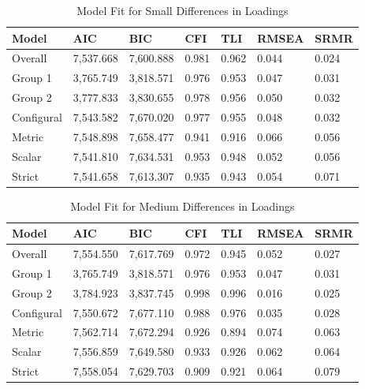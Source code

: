 \documentclass[
  man]{apa7}
\begin{document}
\begin{table}[tbp]

\begin{center}
\begin{threeparttable}

\caption{\label{tab:tab2}Model Fit for Small Differences in Loadings}

\begin{tabular}{lllllll}
\toprule
Model & AIC & BIC & CFI & TLI & RMSEA & SRMR\\
\midrule
Overall & 7,537.668 & 7,600.888 & 0.981 & 0.962 & 0.044 & 0.024\\
Group 1 & 3,765.749 & 3,818.571 & 0.976 & 0.953 & 0.047 & 0.031\\
Group 2 & 3,777.833 & 3,830.655 & 0.978 & 0.956 & 0.050 & 0.032\\
Configural & 7,543.582 & 7,670.020 & 0.977 & 0.955 & 0.048 & 0.032\\
Metric & 7,548.898 & 7,658.477 & 0.941 & 0.916 & 0.066 & 0.056\\
Scalar & 7,541.810 & 7,634.531 & 0.953 & 0.948 & 0.052 & 0.056\\
Strict & 7,541.658 & 7,613.307 & 0.935 & 0.943 & 0.054 & 0.071\\
\bottomrule
\end{tabular}

\end{threeparttable}
\end{center}

\end{table}

\begin{table}[tbp]

\begin{center}
\begin{threeparttable}

\caption{\label{tab:tab3}Model Fit for Medium Differences in Loadings}

\begin{tabular}{lllllll}
\toprule
Model & AIC & BIC & CFI & TLI & RMSEA & SRMR\\
\midrule
Overall & 7,554.550 & 7,617.769 & 0.972 & 0.945 & 0.052 & 0.027\\
Group 1 & 3,765.749 & 3,818.571 & 0.976 & 0.953 & 0.047 & 0.031\\
Group 2 & 3,784.923 & 3,837.745 & 0.998 & 0.996 & 0.016 & 0.025\\
Configural & 7,550.672 & 7,677.110 & 0.988 & 0.976 & 0.035 & 0.028\\
Metric & 7,562.714 & 7,672.294 & 0.926 & 0.894 & 0.074 & 0.063\\
Scalar & 7,556.859 & 7,649.580 & 0.933 & 0.926 & 0.062 & 0.064\\
Strict & 7,558.054 & 7,629.703 & 0.909 & 0.921 & 0.064 & 0.079\\
\bottomrule
\end{tabular}

\end{threeparttable}
\end{center}

\end{table}
\end{document}

